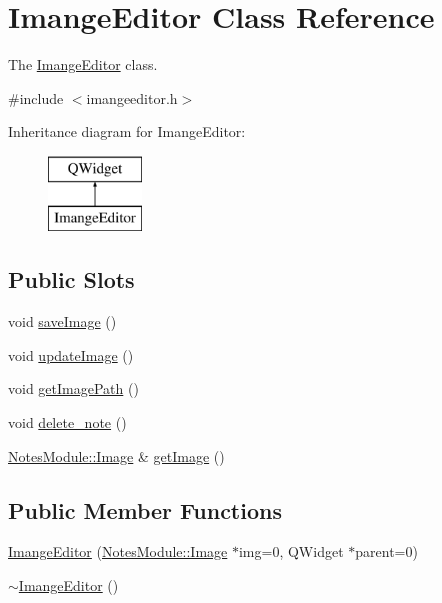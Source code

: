 \hypertarget{class_imange_editor}{\section{Imange\-Editor Class Reference}
\label{class_imange_editor}
}


The \hyperlink{class_imange_editor}{Imange\-Editor} class.  




{\ttfamily \#include $<$imangeeditor.\-h$>$}

Inheritance diagram for Imange\-Editor\-:\begin{figure}[H]
\begin{center}
\leavevmode
\includegraphics[height=2.000000cm]{class_imange_editor}
\end{center}
\end{figure}
\subsection*{Public Slots}
\begin{DoxyCompactItemize}
\item 
void \hyperlink{class_imange_editor_ab7b18e24b72021c47bc3188571ea1deb}{save\-Image} ()
\item 
void \hyperlink{class_imange_editor_a8182b0d3de08e05a431a52e3471444f7}{update\-Image} ()
\item 
void \hyperlink{class_imange_editor_a24d55314727d49ff5da72d653d9a5a72}{get\-Image\-Path} ()
\item 
void \hyperlink{class_imange_editor_a5a3732b1dcf8d4fc4af9f1ba7ca38678}{delete\-\_\-note} ()
\item 
\hyperlink{class_notes_module_1_1_image}{Notes\-Module\-::\-Image} \& \hyperlink{class_imange_editor_a9fa03ffe3773483c75284c7a0164a5c5}{get\-Image} ()
\end{DoxyCompactItemize}
\subsection*{Public Member Functions}
\begin{DoxyCompactItemize}
\item 
\hyperlink{class_imange_editor_a9b61fb9f888b7a793c3d218ec95e9a09}{Imange\-Editor} (\hyperlink{class_notes_module_1_1_image}{Notes\-Module\-::\-Image} $\ast$img=0, Q\-Widget $\ast$parent=0)
\item 
\hyperlink{class_imange_editor_a9b4e502274f99f71f055c65be9b11716}{$\sim$\-Imange\-Editor} ()
\end{DoxyCompactItemize}


